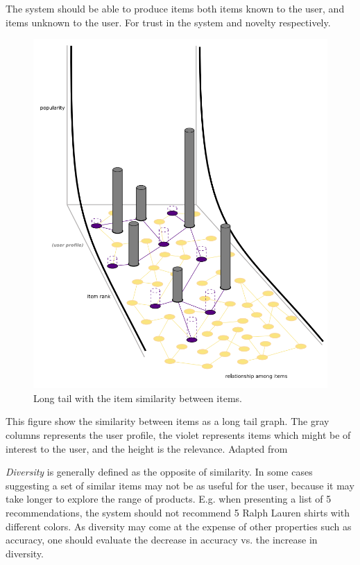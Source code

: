 The system should be able to produce items both items known to the user, and
items unknown to the user.  For trust in the system and novelty respectively.


\begin{figure}[H]
    \centering
    \includegraphics[scale=0.4]{image/longtailNoveltyFig.png}
    \caption{Long tail with the item similarity between items. }
    \label{figure:longtailNovelty}
\end{figure}


This figure show the similarity between items as a long tail graph. The gray
columns represents the user profile, the violet represents items which might be
of interest to the user, and the height is the relevance. Adapted
from~\cite{celma2008}

\textit{Diversity} is generally defined as the opposite of similarity. In some
cases suggesting a set of similar items may not be as useful for the user,
because it may take longer to explore the range of products. E.g. when
presenting a list of 5 recommendations, the system should not recommend 5 Ralph
Lauren shirts with different colors. As diversity may come at the expense of
other properties such as accuracy, one should evaluate the decrease in accuracy
vs. the increase in diversity.

